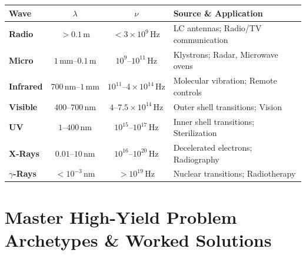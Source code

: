 \documentclass[10pt,twoside,openright]{book}
\begin{document}
\begin{formulabox}
\begin{center}
\footnotesize
\setlength{\tabcolsep}{3pt}
\begin{tabularx}{\linewidth}{|l|c|c|Y|}
\hline
\textbf{Wave} & $\lambda$ & $\nu$ & \textbf{Source \& Application} \\
\hline
\textbf{Radio} & $> 0.1\,\mathrm{m}$ & $< 3 \times 10^9\,\mathrm{Hz}$ & LC antennas; Radio/TV communication \\
\hline
\textbf{Micro} & $1\,\mathrm{mm}\text{--}0.1\,\mathrm{m}$ & $10^9\text{--}10^{11}\,\mathrm{Hz}$ & Klystrons; Radar, Microwave ovens \\
\hline
\textbf{Infrared} & $700\,\mathrm{nm}\text{--}1\,\mathrm{mm}$ & $10^{11}\text{--}4 \times 10^{14}\,\mathrm{Hz}$ & Molecular vibration; Remote controls \\
\hline
\textbf{Visible} & $400\text{--}700\,\mathrm{nm}$ & $4\text{--}7.5 \times 10^{14}\,\mathrm{Hz}$ & Outer shell transitions; Vision \\
\hline
\textbf{UV} & $1\text{--}400\,\mathrm{nm}$ & $10^{15}\text{--}10^{17}\,\mathrm{Hz}$ & Inner shell transitions; Sterilization \\
\hline
\textbf{X-Rays} & $0.01\text{--}10\,\mathrm{nm}$ & $10^{16}\text{--}10^{20}\,\mathrm{Hz}$ & Decelerated electrons; Radiography \\
\hline
\textbf{$\gamma$-Rays} & $< 10^{-3}\,\mathrm{nm}$ & $> 10^{19}\,\mathrm{Hz}$ & Nuclear transitions; Radiotherapy \\
\hline
\end{tabularx}
\end{center}
\end{formulabox}

\section{Master High-Yield Problem Archetypes \& Worked Solutions}
\end{document}
